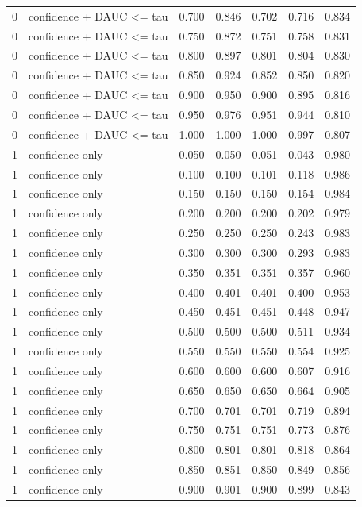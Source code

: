 \begin{tabular}{rlrrrrr}
0 & confidence + DAUC <= tau & 0.700 & 0.846 & 0.702 & 0.716 & 0.834 \\
0 & confidence + DAUC <= tau & 0.750 & 0.872 & 0.751 & 0.758 & 0.831 \\
0 & confidence + DAUC <= tau & 0.800 & 0.897 & 0.801 & 0.804 & 0.830 \\
0 & confidence + DAUC <= tau & 0.850 & 0.924 & 0.852 & 0.850 & 0.820 \\
0 & confidence + DAUC <= tau & 0.900 & 0.950 & 0.900 & 0.895 & 0.816 \\
0 & confidence + DAUC <= tau & 0.950 & 0.976 & 0.951 & 0.944 & 0.810 \\
0 & confidence + DAUC <= tau & 1.000 & 1.000 & 1.000 & 0.997 & 0.807 \\
1 & confidence only & 0.050 & 0.050 & 0.051 & 0.043 & 0.980 \\
1 & confidence only & 0.100 & 0.100 & 0.101 & 0.118 & 0.986 \\
1 & confidence only & 0.150 & 0.150 & 0.150 & 0.154 & 0.984 \\
1 & confidence only & 0.200 & 0.200 & 0.200 & 0.202 & 0.979 \\
1 & confidence only & 0.250 & 0.250 & 0.250 & 0.243 & 0.983 \\
1 & confidence only & 0.300 & 0.300 & 0.300 & 0.293 & 0.983 \\
1 & confidence only & 0.350 & 0.351 & 0.351 & 0.357 & 0.960 \\
1 & confidence only & 0.400 & 0.401 & 0.401 & 0.400 & 0.953 \\
1 & confidence only & 0.450 & 0.451 & 0.451 & 0.448 & 0.947 \\
1 & confidence only & 0.500 & 0.500 & 0.500 & 0.511 & 0.934 \\
1 & confidence only & 0.550 & 0.550 & 0.550 & 0.554 & 0.925 \\
1 & confidence only & 0.600 & 0.600 & 0.600 & 0.607 & 0.916 \\
1 & confidence only & 0.650 & 0.650 & 0.650 & 0.664 & 0.905 \\
1 & confidence only & 0.700 & 0.701 & 0.701 & 0.719 & 0.894 \\
1 & confidence only & 0.750 & 0.751 & 0.751 & 0.773 & 0.876 \\
1 & confidence only & 0.800 & 0.801 & 0.801 & 0.818 & 0.864 \\
1 & confidence only & 0.850 & 0.851 & 0.850 & 0.849 & 0.856 \\
1 & confidence only & 0.900 & 0.901 & 0.900 & 0.899 & 0.843 \\

\end{tabular}
